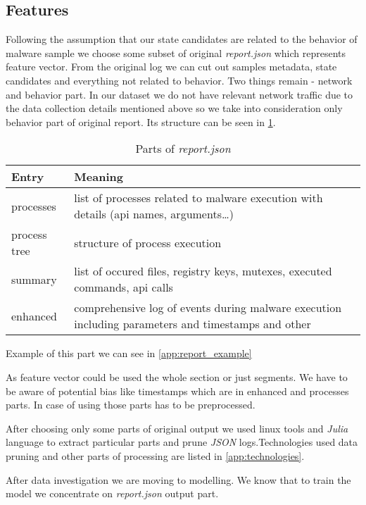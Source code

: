 \subsection{Features}
Following the assumption that our state candidates are related to the behavior of malware sample we choose some subset of original \emph{report.json} which represents feature vector. From the original log we can cut out samples metadata, state candidates and everything not related to behavior. Two things remain - network and behavior part. In our dataset we do not have relevant network traffic due to the data collection details mentioned above so we take into consideration only behavior part of original report. Its structure can be seen in \ref{tab:behavioral}.

\begin{table}[h]
    \centering
    \caption{Parts of \emph{report.json}}
    \begin{tabular}{p{2cm}p{12cm}} 
        \toprule
        \textbf{Entry} &
        \textbf{Meaning} \\
        \midrule
        processes & list of processes related to malware execution with details (api names, arguments\dots) \\
        \midrule
        process tree & structure of process execution\\
        \midrule
        summary & list of occured files, registry keys, mutexes, executed commands, api calls \\
        \midrule
        enhanced & comprehensive log of events during malware execution including parameters and timestamps and other\\
        \bottomrule
    \end{tabular}
    \label{tab:behavioral}
\end{table}
Example of this part we can see in \ref{app:report_example}

As feature vector could be used the whole section or just segments. We have to be aware of potential bias like timestamps which are in enhanced and processes parts. In case of using those parts has to be preprocessed.

After choosing only some parts of original output we used linux tools and \emph{Julia} language to extract particular parts and prune \emph{JSON} logs.Technologies used data pruning and other parts of processing are listed in \ref{app:technologies}.


After data investigation we are moving to modelling. We know that to train the model we concentrate on \emph{report.json} output part.



